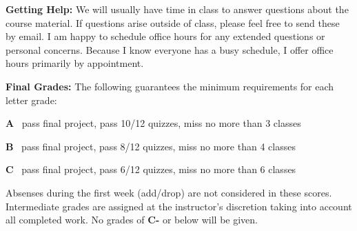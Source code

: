 \documentclass[11pt, a4paper]{article}
\begin{document}
\bigskip

\textbf{Getting Help:}
We will usually have time in class to answer questions about the course
material. If questions arise outside of class, please feel free to send
these by email. I am happy to schedule office hours for
any extended questions or personal concerns. Because I know everyone has a
busy schedule, I offer office hours primarily by appointment.

\bigskip

\textbf{Final Grades:}
The following guarantees the minimum requirements for each letter grade:
\begin{description}
   \setlength\itemsep{0em}
  \item \textbf{A} \textrightarrow\, pass final project, pass 10/12 quizzes,
  miss no more than 3 classes
  \item \textbf{B} \textrightarrow\, pass final project, pass 8/12 quizzes,
  miss no more than 4 classes
  \item \textbf{C} \textrightarrow\, pass final project, pass 6/12 quizzes,
  miss no more than 6 classes
\end{description}
Absenses during the first week (add/drop) are not considered in these scores.
Intermediate grades are assigned at the instructor's discretion taking into 
account all completed work. No grades of \textbf{C-} or below will be given.
\end{document}
